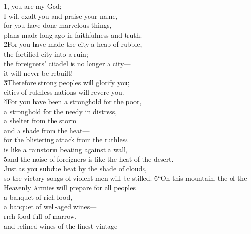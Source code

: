 \begin{poetry}
\poeml {}
\v{1}, you are my God; \\
\poemll    I will exalt you and praise your name, \\
\poeml for you have done marvelous things, \\
\poemlll       plans made long ago in faithfulness and truth. \\
\poeml \v{2}For you have made the city a heap of rubble, \\
\poemll    the fortified city into a ruin; \\
\poeml the foreigners' citadel is no longer a city--- \\
\poemll    it will never be rebuilt! \\
\poeml \v{3}Therefore strong peoples will glorify you; \\
\poemll    cities of ruthless nations will revere you. \\
\poeml \v{4}For you have been a stronghold for the poor, \\
\poemll    a stronghold for the needy in distress, \\
\poeml a shelter from the storm \\
\poemll    and a shade from the heat--- \\
\poeml for the blistering attack from the ruthless \\
\poemll    is like a rainstorm beating against a wall, \\
\poeml \v{5}and the noise of foreigners is like the heat of the desert. \\
\poemll    Just as you subdue heat by the shade of clouds, \\
\poemlll       so the victory songs of violent men will be stilled.
\poeml \v{6}``On this mountain, the  of the Heavenly Armies will prepare for all peoples \\
\poemll    a banquet of rich food, \\
\poeml a banquet of well-aged wines--- \\
\poemll    rich food full of marrow, \\
\poemlll       and refined wines of the finest vintage \\

\end{poetry}

